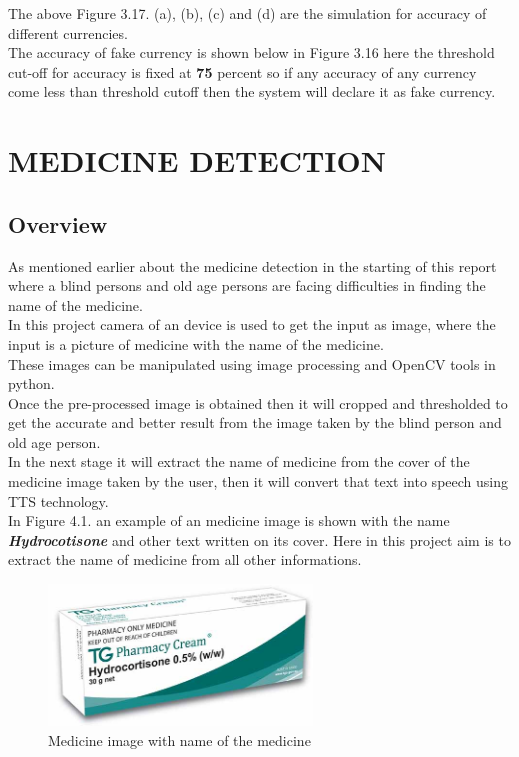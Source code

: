 \newpage
\noindent The above Figure 3.17. (a), (b), (c) and (d) are the simulation for accuracy of different currencies.\\
The accuracy of fake currency is shown below in Figure 3.16 here the threshold cut-off for accuracy is fixed at {\bf 75} percent  so if any accuracy of any currency come less than threshold cutoff  then the system will declare it as fake currency.
\chapter{MEDICINE DETECTION}
\section{Overview}
 As mentioned earlier about the medicine detection in the starting of this report where a blind persons and old age persons are facing difficulties in finding the name of the medicine.\\In this project camera of an device is used to get the input as image, where the input is a picture of medicine with the name of the medicine.\\These images can be manipulated using image processing and OpenCV tools in python.\\Once the pre-processed image is obtained then it will cropped and thresholded to get the accurate and better result from the image taken by the blind person and old age person.\\In the next stage it will extract the name of medicine from the cover of the medicine image taken by the user, then it will convert that text into speech using TTS technology.\\In Figure 4.1. an example of an medicine image is shown with the name \textbf{\textit{Hydrocotisone}} and other text written on its cover. Here in this project aim is to extract the name of medicine from all other informations. 
\begin{figure}
	\centering
	\includegraphics[width=70mm]{CHAPTERS/c31.PNG}
	\caption{Medicine image with name of the medicine}
\end{figure}
\newpage
